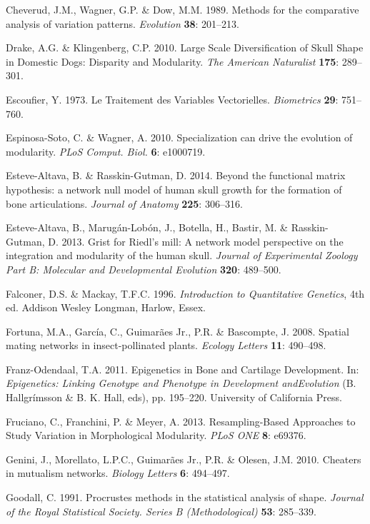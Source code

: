 \documentclass[12pt,]{article}
\begin{document}
Cheverud, J.M., Wagner, G.P. \& Dow, M.M. 1989. Methods for the
comparative analysis of variation patterns. \emph{Evolution}
\textbf{38}: 201--213.

Drake, A.G. \& Klingenberg, C.P. 2010. Large Scale Diversification of
Skull Shape in Domestic Dogs: Disparity and Modularity. \emph{The
American Naturalist} \textbf{175}: 289--301.

Escoufier, Y. 1973. Le Traitement des Variables Vectorielles.
\emph{Biometrics} \textbf{29}: 751--760.

Espinosa-Soto, C. \& Wagner, A. 2010. Specialization can drive the
evolution of modularity. \emph{PLoS Comput. Biol.} \textbf{6}: e1000719.

Esteve-Altava, B. \& Rasskin-Gutman, D. 2014. Beyond the functional
matrix hypothesis: a network null model of human skull growth for the
formation of bone articulations. \emph{Journal of Anatomy} \textbf{225}:
306--316.

Esteve-Altava, B., Marugán-Lobón, J., Botella, H., Bastir, M. \&
Rasskin-Gutman, D. 2013. Grist for Riedl's mill: A network model
perspective on the integration and modularity of the human skull.
\emph{Journal of Experimental Zoology Part B: Molecular and
Developmental Evolution} \textbf{320}: 489--500.

Falconer, D.S. \& Mackay, T.F.C. 1996. \emph{Introduction to
Quantitative Genetics}, 4th ed. Addison Wesley Longman, Harlow, Essex.

Fortuna, M.A., García, C., Guimarães Jr., P.R. \& Bascompte, J. 2008.
Spatial mating networks in insect-pollinated plants. \emph{Ecology
Letters} \textbf{11}: 490--498.

Franz-Odendaal, T.A. 2011. Epigenetics in Bone and Cartilage
Development. In: \emph{Epigenetics: Linking Genotype and Phenotype in
Development andEvolution} (B. Hallgrímsson \& B. K. Hall, eds), pp.
195--220. University of California Press.

Fruciano, C., Franchini, P. \& Meyer, A. 2013. Resampling-Based
Approaches to Study Variation in Morphological Modularity. \emph{PLoS
ONE} \textbf{8}: e69376.

Genini, J., Morellato, L.P.C., Guimarães Jr., P.R. \& Olesen, J.M. 2010.
Cheaters in mutualism networks. \emph{Biology Letters} \textbf{6}:
494--497.

Goodall, C. 1991. Procrustes methods in the statistical analysis of
shape. \emph{Journal of the Royal Statistical Society. Series B
(Methodological)} \textbf{53}: 285--339.
\end{document}
